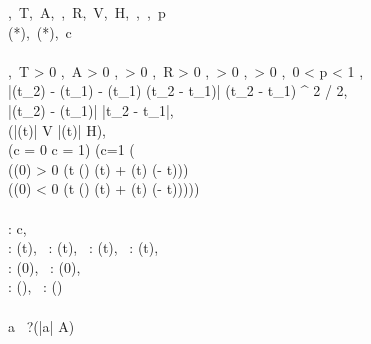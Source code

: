 \begin{figure}
  \small
  \begin{center}
  \begin{sllisting}
    \renewcommand{\arraystretch}{1.2}
    \slconstant
      \catm,\, T,\, A,\, \caAint,\, R,\, V,\, H,\,
      \caSigmaOne,\, \caSigmaTwo,\, p \\
    \slunknown \cavint(*),\, \cahint(*),\, c \\
    \slassume \\
      \slind \catm {} ,\,
      T > 0 ,\,
      A > 0 ,\,
      \caAint > 0 ,\,
      R > 0 ,\,
      \caSigmaOne > 0 ,\,
      \caSigmaTwo > 0 ,\,
      0 < p < 1 ,\, \\
    \slind
       
        |\cahint(t_2) - \cahint(t_1) - \cavint(t_1) \cdot (t_2 - t_1)| \leq
        \caAint \cdot (t_2 - t_1) ^ 2 / 2, \\
    \slind
       
        |\cavint(t_2) - \cavint(t_1)| \le \caAint |t_2 - t_1|, \\
    \slind
       (|\cavint(t)| \leq V \wedge |\cahint(t)| \leq H), \\
    \slind (c = 0 \lor c = 1) \land (c=1 \limply (\\
      \slind[2] (\cahint(0) > 0 \rightarrow {} (t \leq \catm \rightarrow \cahint(\catm) \geq \cahint(t) + \cavint(t) \cdot (\catm - t))) \ \land \  \\
      \slind[2] (\cahint(0) < 0 \rightarrow {} (t \leq \catm \rightarrow \cahint(\catm) \leq \cahint(t) + \cavint(t) \cdot (\catm - t)))))\\
    \slbound \\
      \slind \cacmin: \cacmin \le c, \, \\
      \slind
        \cavintmin: \cavintmin \le \cavint(t), \,
        \cavintmax: \cavintmax \ge \cavint(t), \,
        \cahintmin: \cahintmin \le \cahint(t), \,
        \cahintmax: \cahintmax \ge \cahint(t), \,
        \\
      \slind
        \cahzerointmin: \cahzerointmin \le \cahint(0), \,
        \cahzerointmax: \cahzerointmax \ge \cahint(0), \,
        \\
      \slind
        \cahmintmin: \cahmintmin \le \cahint(\catm), \,
        \cahmintmax: \cahmintmax \ge \cahint(\catm)
        \\
    \slcontroller \\
      \slind a \dlassign * \seq \, ?(|a| \leq A) \seq \\

\end{sllisting}
\end{center}
\end{figure}
